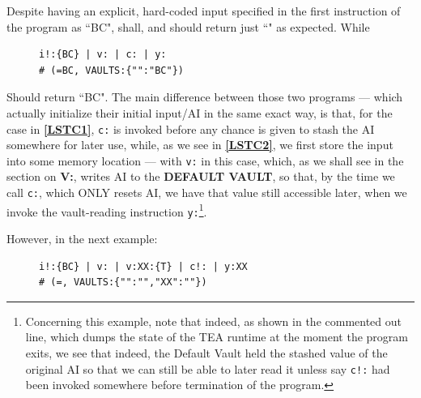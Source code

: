 \documentclass[a4paper, 18pt]{book} %
\begin{document}
Despite having an explicit, hard-coded input specified in the first instruction of the program as ``BC", shall, and should return just ``" as expected. While  


\begin{figure}[H]
 \Large
  \centering
  \begin{tcolorbox}[teaterminalstyle, title=TEA Program: \texttt{c:} does not clear DEFAULT VAULT]
  \begin{lstlisting}[language=TEA, caption={TP C2}, label={LSTC2}, ]
i!:{BC} | v: | c: | y:
# (=BC, VAULTS:{"":"BC"})
   \end{lstlisting}
  \end{tcolorbox}
\end{figure}

Should return ``BC". The main difference between those two programs --- which actually initialize their initial input/AI in the same exact way, is that, for the case in \textbf{\autoref{LSTC1}}, \texttt{c:} is invoked before any chance is given to stash the AI somewhere for later use, while, as we see in \textbf{\autoref{LSTC2}}, we first store the input into some memory location --- with \texttt{v:} in this case, which, as we shall see in the section on \textbf{V:}, writes AI to the \textbf{DEFAULT VAULT}, so that, by the time we call \texttt{c:}, which ONLY resets AI, we have that value still accessible later, when we invoke the vault-reading instruction \texttt{y:}\footnote{Concerning this example, note that indeed, as shown in the commented out line, which dumps the state of the TEA runtime at the moment the program exits, we see that indeed, the Default Vault held the stashed value of the original AI so that we can still be able to later read it unless say \texttt{c!:} had been invoked somewhere before termination of the program.}.

However, in the next example:


\begin{figure}[H]
 \Large
  \centering
  \begin{tcolorbox}[teaterminalstyle, title=TEA Program: \texttt{c!:} resets all memory]
  \begin{lstlisting}[language=TEA, caption={TP C3}, label={LSTC3}, ]
i!:{BC} | v: | v:XX:{T} | c!: | y:XX
# (=, VAULTS:{"":"","XX":""})
   \end{lstlisting}
  \end{tcolorbox}
\end{figure}
\end{document}
